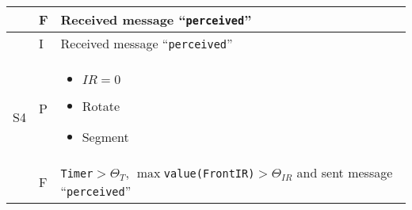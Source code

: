 \begin{longtable}{||p{.5cm}|p{.5cm}|p{8.5cm}||}
 & F & Received message ``\texttt{perceived}''\\\hline
\multirow{3}{1cm}{S4} & I & Received message ``\texttt{perceived}''\\\cline{2-3}
 & P & \begin{itemize}
\item $IR=0$
\item Rotate
\item Segment
\end{itemize}\\\cline{2-3}
 & F & \texttt{Timer}$>\Theta_T$, $\max$\texttt{value(FrontIR)}$>\Theta_{IR}$ and sent message ``\texttt{perceived}''\\\hline
\end{longtable}


